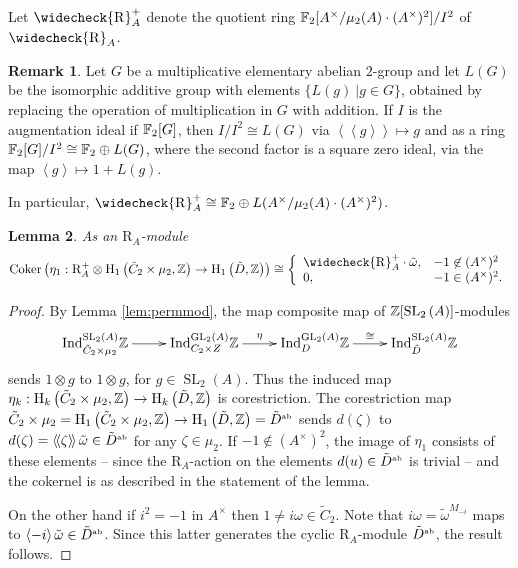 \documentclass[12pt]{amsart}
\newtheorem{lem}{Lemma}[section]
\theoremstyle{definition}
\newtheorem{rem}[lem]{Remark}
\newcommand{\F}[1]{\Bbb{F}_{#1}}
\newcommand{\Z}{\Bbb{Z}}
\newcommand{\spl}[2]{\operatorname{SL}_{#1}\left(#2\right)}
\newcommand{\gl}[2]{\mathrm{GL}_{#1}(#2)}
\newcommand{\<}{\langle}
\renewcommand{\>}{\rangle}
\newcommand{\coker}[1]{\mathrm{Coker}\left(#1\right)}
\newcommand{\sgr}[1]{\mathrm{R}_{#1}}%
\newcommand{\rsgr}[1]{\widecheck{\mathrm{R}}_{#1}}%
\newcommand{\qsgr}[1]{\mathrm{R}^{+}_{#1}} %
\newcommand{\tsgr}[1]{\widecheck{\mathrm{R}}^{+}_{#1}} %
\newcommand{\an}[1]{\left\langle{#1}\right\rangle}
\newcommand{\pf}[1]{\left\langle\!\left\langle{#1}\right\rangle\!\right\rangle}
\newcommand{\aug}[1]{\mathcal{I}_{#1}}
\newcommand{\gab}[1]{{#1}^{\mbox{\tiny{ab}}}}%
\newcommand{\ho}[3]{\mathrm{H}_{#1}\left( #2,#3 \right)}
\newcommand{\Ind}[3]{\mathrm{Ind}_{#1}^{#2}#3}
\begin{document}

Let $\tsgr{A}$ denote the quotient ring $\F{2}[A^\times/\mu_2(A)\cdot(A^\times)^2]/I^2$ of $\rsgr{A}$. 

\begin{rem} Let $G$ be a multiplicative elementary abelian $2$-group and let $L(G)$ be the isomorphic additive group with elements $\{ L(g)\ | g\in G\}$, obtained by replacing the operation of multiplication in $G$ with addition. If $I$ is the augmentation ideal if $\F{2}[G]$, then $I/I^2\cong L(G)$ via $\pf{g}\mapsto g$ and as a ring $\F{2}[G]/I^2\cong \F{2}\oplus L(G)$, where the second factor is a square zero ideal, via the map $\an{g}\mapsto 1+L(g)$.

In particular,  $\tsgr{A}\cong \F{2}\oplus L(A^\times/\mu_2(A)\cdot(A^\times)^2)$.
\end{rem}




\begin{lem}\label{lem:eta1} As an $\sgr{A}$-module
\[
\coker{\eta_1:\qsgr{A}\otimes\ho{1}{\tilde{C}_2\times\mu_2}{\Z}\to \ho{1}{\tilde{D}}{\Z}}\cong
\left\{
\begin{array}{ll}
\tsgr{A}\cdot\tilde{\omega},& -1\not\in (A^\times)^2\\
0,& -1\in (A^\times)^2.
\end{array}
\right.
\]
\end{lem}

\begin{proof} By Lemma \ref{lem:permmod}, the map composite map of $\Z[\spl{2}{A}]$-modules
\[
\xymatrix{
\Ind{\tilde{C}_2\times\mu_2}{\spl{2}{A}}{\Z}\ar[r]&\Ind{C_2\times Z}{\gl{2}{A}}{\Z}\ar^-{\eta}[r]&\Ind{D}{\gl{2}{A}}{\Z}\ar^-{\cong}[r]&\Ind{\tilde{D}}{\spl{2}{A}}{\Z}\\
}
\]
sends $1\otimes g$ to $1\otimes g$, for $g\in \spl{2}{A}$. Thus the induced map\\
 $\eta_k:\ho{k}{\tilde{C}_2\times\mu_2}{\Z}\to\ho{k}{\tilde{D}}{\Z}$ is corestriction. The corestriction map $\tilde{C}_2\times\mu_2=\ho{1}{\tilde{C}_2\times \mu_2}{\Z}\to
\ho{1}{\tilde{D}}{\Z}=\gab{\tilde{D}}$ sends $d(\zeta)$ to $d(\zeta)=\pf{\zeta}\tilde{\omega}\in \gab{\tilde{D}}$ for any $\zeta\in \mu_2$. If $-1\not\in (A^\times)^2$,  the image of $\eta_1$ consists of these elements -- since the $\sgr{A}$-action on the elements $d(u)\in\gab{\tilde{D}}$ is trivial --  and the cokernel is as described in the statement of the lemma.

On the other hand if $i^2=-1$ in $A^\times$ then $1\not= i\omega\in \tilde{C}_2$. Note that $i\omega=\tilde{\omega}^{M_{-i}}$ maps to $\an{-i}\tilde{\omega}\in\gab{\tilde{D}}$.
Since this latter generates the cyclic $\sgr{A}$-module $\gab{\tilde{D}}$, the result follows.
\end{proof}
\end{document}
